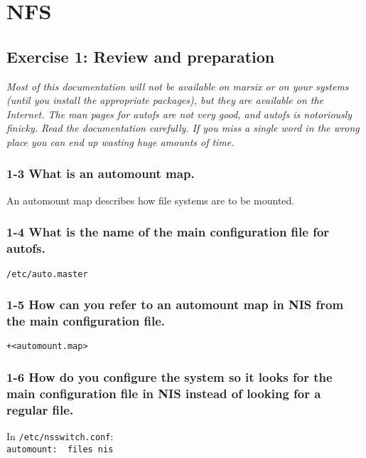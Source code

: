 
\chapter{NFS}
\section{Exercise 1: Review and preparation}
\em Most of this documentation will not be available on marsix or on your systems (until you install the appropriate packages), but they are available on the Internet. The man pages for autofs are not very good, and autofs is notoriously finicky. Read the documentation carefully. If you miss a single word in the wrong place you can end up wasting huge amounts of time.\em



\subsection{1-3 What is an automount map.}
An automount map describes how file systems are to be mounted.

\subsection{1-4 What is the name of the main configuration file for autofs.}
\verb=/etc/auto.master=

\subsection{1-5 How can you refer to an automount map in NIS from the main configuration file.}
\verb=+<automount.map>=


\subsection{1-6 How do you configure the system so it looks for the main configuration file in NIS instead of looking for a regular file.}
In \verb=/etc/nsswitch.conf=:\\
\verb=automount:  files nis=

